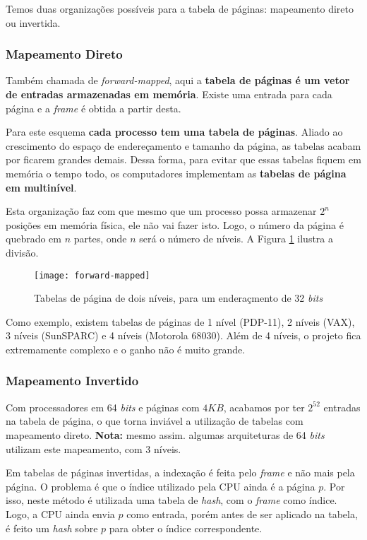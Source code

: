 Temos duas organizações possíveis para a tabela de páginas: mapeamento direto ou invertida.

\subsubsection{Mapeamento Direto}
Também chamada de \textit{forward-mapped}, aqui a \textbf{tabela de páginas é um vetor de entradas armazenadas em memória}. Existe uma entrada para cada página e a \textit{frame} é obtida a partir desta.

Para este esquema \textbf{cada processo tem uma tabela de páginas}. Aliado ao crescimento do espaço de endereçamento e tamanho da página, as tabelas acabam por ficarem grandes demais. Dessa forma, para evitar que essas tabelas fiquem em memória o tempo todo, os computadores implementam as \textbf{tabelas de página em  multinível}.

Esta organização faz com que mesmo que um processo possa armazenar $2^n$ posições em memória física, ele não vai fazer isto. Logo, o número da página é quebrado em $n$ partes, onde $n$ será o número de níveis. A Figura \ref{fig:forward-mapped} ilustra a divisão.

\begin{figure}[h]
  \centering
  \texttt{[image: forward-mapped]}
  \caption{Tabelas de página de dois níveis, para um enderaçmento de 32 \textit{bits}}
  \label{fig:forward-mapped}
\end{figure}

Como exemplo, existem tabelas de páginas de 1 nível (PDP-11), 2 níveis (VAX), 3 níveis (SunSPARC) e 4 níveis (Motorola 68030). Além de 4 níveis, o projeto fica extremamente complexo e o ganho não é muito grande.




\subsubsection{Mapeamento Invertido}
Com processadores em 64 \textit{bits} e páginas com $4KB$, acabamos por ter $2^52$ entradas na tabela de página, o que torna inviável a utilização de tabelas com mapeamento direto. \textbf{Nota:} mesmo assim. algumas arquiteturas de 64 \textit{bits} utilizam este mapeamento, com 3 níveis.

Em tabelas de páginas invertidas, a indexação é feita pelo \textit{frame} e não mais pela página. O problema é que o índice utilizado pela CPU ainda é a página $p$. Por isso, neste método é utilizada uma tabela de \textit{hash}, com o \textit{frame} como índice. Logo, a CPU ainda envia $p$ como entrada, porém antes de ser aplicado na tabela, é feito um \textit{hash} sobre $p$ para obter o índice correspondente.

